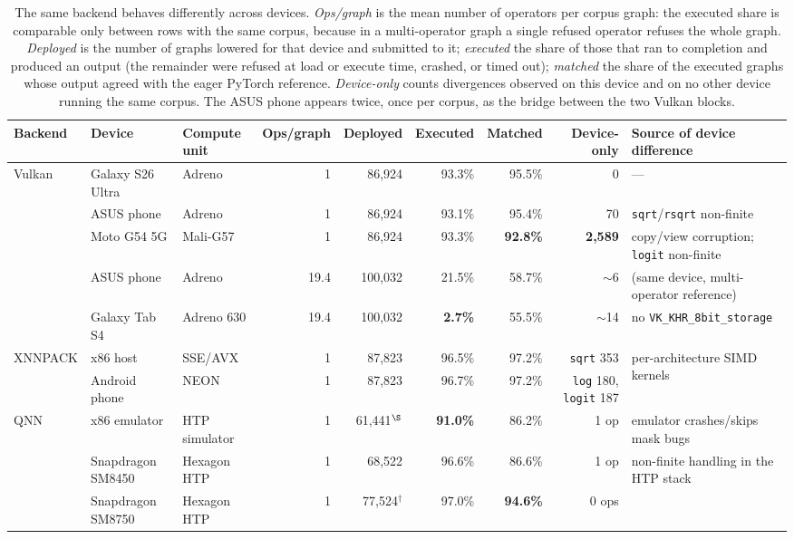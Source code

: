 \begin{table}[t]
\centering
\small
\caption{The same backend behaves differently across devices. \emph{Ops/graph} is the mean number of
operators per corpus graph: the executed share is comparable only between rows with the same corpus,
because in a multi-operator graph a single refused operator refuses the whole graph. \emph{Deployed}
is the number of graphs lowered for that device and submitted to it; \emph{executed} the share of
those that ran to completion and produced an output (the remainder were refused at load or execute
time, crashed, or timed out); \emph{matched} the share of the executed graphs whose output agreed
with the eager PyTorch reference. \emph{Device-only} counts divergences observed on this device and
on no other device running the same corpus. The ASUS phone appears twice, once per corpus, as the
bridge between the two Vulkan blocks.}
\label{tab:device-dependence}
\begin{tabular}{lllrrrrrl}
\toprule
Backend & Device & Compute unit & Ops/graph & Deployed & Executed & Matched & Device-only & Source of device difference \\
\midrule
\multirow{5}{*}{Vulkan}
 & Galaxy S26 Ultra & Adreno     & 1 & 86{,}924 & 93.3\% & 95.5\% & 0 & --- \\
 & ASUS phone       & Adreno     & 1 & 86{,}924 & 93.1\% & 95.4\% & \phantom{0,}\phantom{0}70 & \texttt{sqrt}/\texttt{rsqrt} non-finite \\
 & Moto G54 5G      & Mali-G57   & 1 & 86{,}924 & 93.3\% & \textbf{92.8\%} & \textbf{2{,}589} & copy/view corruption; \texttt{logit} non-finite \\
\cmidrule(l){2-9}
 & ASUS phone       & Adreno     & 19.4 & 100{,}032 & 21.5\% & 58.7\% & $\sim$\phantom{0,0}6 & (same device, multi-operator reference) \\
 & Galaxy Tab S4    & Adreno 630 & 19.4 & 100{,}032 & \textbf{\phantom{0}2.7\%} & 55.5\% & $\sim$\phantom{0,0}14 & no \verb|VK_KHR_8bit_storage| \\
\midrule
\multirow{2}{*}{XNNPACK}
 & x86 host        & SSE/AVX     & 1 & 87{,}823 & 96.5\% & 97.2\% & \texttt{sqrt} 353 & \multirow{2}{*}{per-architecture SIMD kernels} \\
 & Android phone   & NEON        & 1 & 87{,}823 & 96.7\% & 97.2\% & \texttt{log} 180, \texttt{logit} 187 & \\
\midrule
\multirow{3}{*}{QNN}
 & x86 emulator      & HTP simulator & 1 & 61{,}441$^{\S}$ & \textbf{91.0\%} & 86.2\% & 1 op & emulator crashes/skips mask bugs \\
 & Snapdragon SM8450 & Hexagon HTP   & 1 & 68{,}522 & 96.6\% & 86.6\% & 1 op & \multirow{2}{*}{non-finite handling in the HTP stack} \\
 & Snapdragon SM8750 & Hexagon HTP   & 1 & 77{,}524$^{\dagger}$ & 97.0\% & \textbf{94.6\%} & 0 ops & \\
\bottomrule
\end{tabular}


\end{table}
